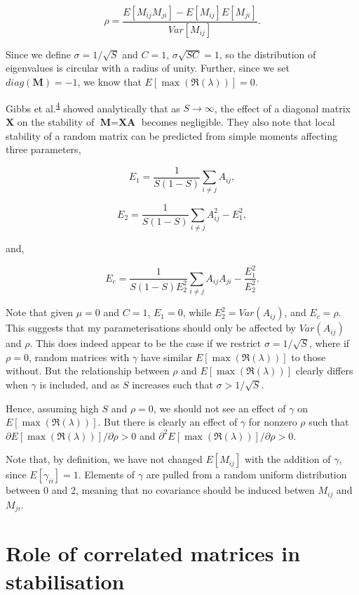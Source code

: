 \documentclass[]{article}
\begin{document}
\[\rho = \frac{E[M_{ij}M_{ji}] - E[M_{ij}]E[M_{ji}]}{Var[M_{ij}]}.\]

Since we define \(\sigma = 1/\sqrt{S}\) and \(C = 1\),
\(\sigma\sqrt{SC} = 1\), so the distribution of eigenvalues is circular
with a radius of unity. Further, since we set \(diag(\textbf{M}) = -1\),
we know that \(E[\max(\Re(\lambda))] = 0\).

Gibbs et al.\textsuperscript{\protect\hyperlink{ref-Gibbs2017}{4}}
showed analytically that as \(S \to \infty\), the effect of a diagonal
matrix \(\textbf{X}\) on the stability of \(\textbf{M} = \textbf{XA}\)
becomes negligible. They also note that local stability of a random
matrix can be predicted from simple moments affecting three parameters,

\[E_{1} = \frac{1}{S(1-S)}\sum_{i \neq j}A_{ij},\]

\[E_{2} = \frac{1}{S(1-S)}\sum_{i \neq j}A^{2}_{ij} - E^{2}_{1},\]

and,

\[E_{c} = \frac{1}{S(1-S)E^{2}_{2}}\sum_{i \neq j} A_{ij} A_{ji} - \frac{E^{2}_{1}}{E^{2}_{2}}.\]

Note that given \(\mu = 0\) and \(C = 1\), \(E_{1} = 0\), while
\(E^{2}_{2} = Var(A_{ij})\), and \(E_{c} = \rho\). This suggests that my
parameterisations should only be affected by \(Var(A_{ij})\) and
\(\rho\). This does indeed appear to be the case if we restrict
\(\sigma = 1/\sqrt{S}\), where if \(\rho = 0\), random matrices with
\(\gamma\) have similar \(E[\max(\Re(\lambda))]\) to those without. But
the relationship between \(\rho\) and \(E[\max(\Re(\lambda))]\) clearly
differs when \(\gamma\) is included, and as \(S\) increases such that
\(\sigma > 1/\sqrt{S}\).

Hence, assuming high \(S\) and \(\rho = 0\), we should not see an effect
of \(\gamma\) on \(E[\max(\Re(\lambda))]\). But there is clearly an
effect of \(\gamma\) for nonzero \(\rho\) such that
\(\partial E[\max(\Re(\lambda))] / \partial\rho > 0\) and
\(\partial^{2} E[\max(\Re(\lambda))] / \partial\rho > 0\).

Note that, by definition, we have not changed \(E[M_{ij}]\) with the
addition of \(\gamma\), since \(E[\gamma_{ii}] = 1\). Elements of
\(\gamma\) are pulled from a random uniform distribution between 0 and
2, meaning that no covariance should be induced betwen \(M_{ij}\) and
\(M_{ji}\).

\hypertarget{role-of-correlated-matrices-in-stabilisation}{%
\section{Role of correlated matrices in
stabilisation}\label{role-of-correlated-matrices-in-stabilisation}}
\end{document}
